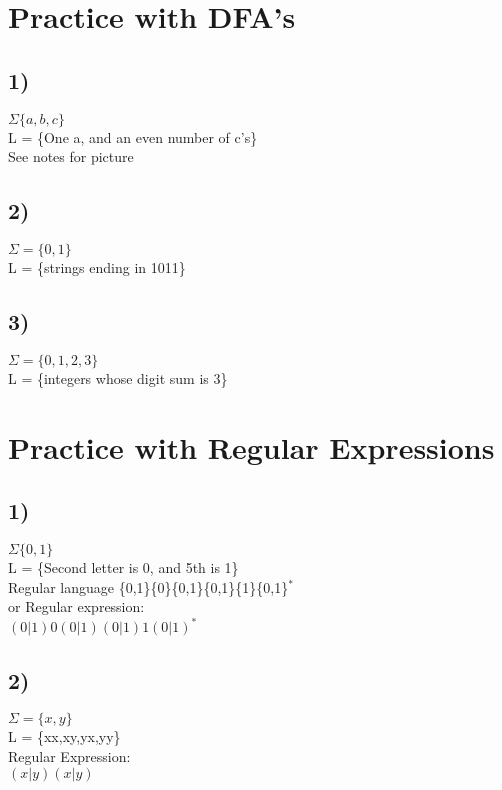\documentclass[12pt]{article}
\begin{document}
	\section*{Practice with DFA's}
	\subsection{1)}
	$\Sigma \{a,b,c\}$\\
	L = \{One a, and an even number of c's\}\\
	See notes for picture\\
	
	\subsection*{2)}
	$\Sigma = \{0,1\}$\\
	L = \{strings ending in 1011\}\\
	
	\subsection*{3)}
	$\Sigma = \{0,1,2,3\}$\\
	L = \{integers whose digit sum is 3\}\\
	
	\section*{Practice with Regular Expressions}
	\subsection*{1)}
	$\Sigma \{0,1\}$\\
	L = \{Second letter is 0, and 5th is 1\}\\
	
	Regular language
	\{0,1\}\{0\}\{0,1\}\{0,1\}\{1\}\{0,1\}$^*$\\
	or Regular expression:\\
	$(0|1)0(0|1)(0|1)1(0|1)^*$\\
	
	\subsection*{2)}
	$\Sigma = \{x,y\}$\\
	L = \{xx,xy,yx,yy\}\\
	
	Regular Expression:\\
	$(x|y)(x|y)$\\
	
\end{document}
